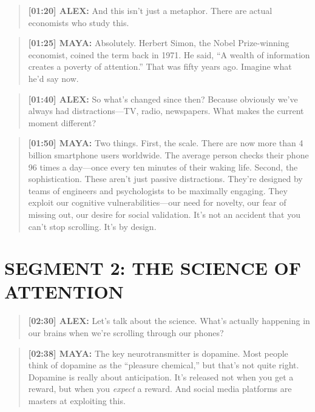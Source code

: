 \documentclass[
    language=english,
    doctype=podcast-script,
    institution=none,
]{../../omnilatex}
\begin{document}
\begin{quote}
\textbf{[01:20] ALEX:} And this isn't just a metaphor. There are actual economists who study this.
\end{quote}

\begin{quote}
\textbf{[01:25] MAYA:} Absolutely. Herbert Simon, the Nobel Prize-winning economist, coined the term back in 1971. He said, ``A wealth of information creates a poverty of attention.'' That was fifty years ago. Imagine what he'd say now.
\end{quote}

\begin{quote}
\textbf{[01:40] ALEX:} So what's changed since then? Because obviously we've always had distractions---TV, radio, newspapers. What makes the current moment different?
\end{quote}

\begin{quote}
\textbf{[01:50] MAYA:} Two things. First, the scale. There are now more than 4 billion smartphone users worldwide. The average person checks their phone 96 times a day---once every ten minutes of their waking life. Second, the sophistication. These aren't just passive distractions. They're designed by teams of engineers and psychologists to be maximally engaging. They exploit our cognitive vulnerabilities---our need for novelty, our fear of missing out, our desire for social validation. It's not an accident that you can't stop scrolling. It's by design.
\end{quote}

\section*{SEGMENT 2: THE SCIENCE OF ATTENTION}

\begin{quote}
\textbf{[02:30] ALEX:} Let's talk about the science. What's actually happening in our brains when we're scrolling through our phones?
\end{quote}

\begin{quote}
\textbf{[02:38] MAYA:} The key neurotransmitter is dopamine. Most people think of dopamine as the ``pleasure chemical,'' but that's not quite right. Dopamine is really about anticipation. It's released not when you get a reward, but when you \textit{expect} a reward. And social media platforms are masters at exploiting this.
\end{quote}
\end{document}
